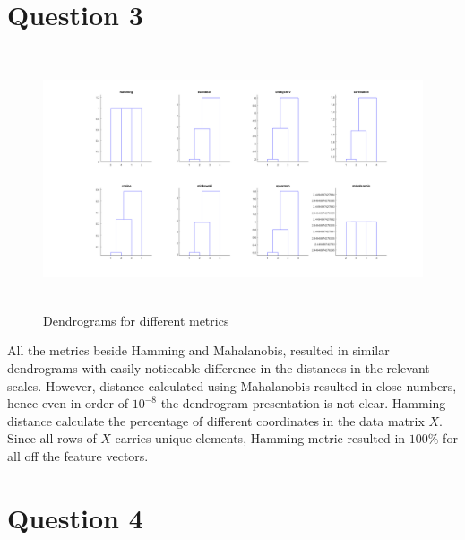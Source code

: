 \documentclass[11pt]{extarticle}
\begin{document}
\section{Question 3}
\begin{figure}[h]
    \centering
    \includegraphics[width = 6.2in, height = 3in]{Q3.png}
    \caption{Dendrograms for different metrics}
    \label{fig:q3fig}
\end{figure}

All the metrics beside Hamming and Mahalanobis, resulted in similar dendrograms with easily noticeable difference in the distances in the relevant scales. However, distance calculated using Mahalanobis resulted in close numbers, hence even in
order of $10^{-8}$ the dendrogram presentation is not clear. Hamming distance calculate the percentage of different coordinates in the data matrix $X$. Since all rows of $X$ carries unique elements, Hamming metric resulted in $100\%$ for all off the feature vectors.

\pagebreak

\section{Question 4}
\end{document}
